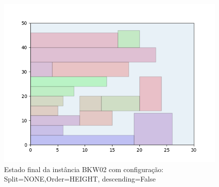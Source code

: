 \begin{figure}[H]
    \centering
    \caption[]{Estado final da instância BKW02 com configuração: Split=NONE,Order=HEIGHT, descending=False}
    \label{fig:bkw02-none-height-false}
    \includegraphics[scale=0.5]{output/figures/bkw/bkw02/none/height/false/00}
\end{figure}